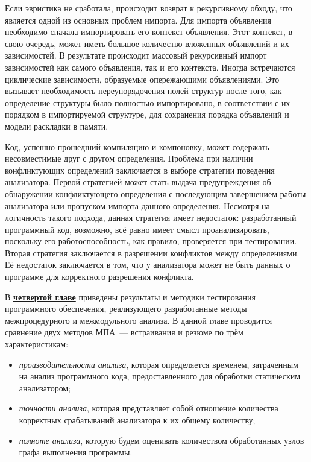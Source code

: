 Если эвристика не сработала, происходит возврат к рекурсивному обходу, что является одной из основных проблем импорта. Для импорта объявления необходимо сначала импортировать его контекст объявления. Этот контекст, в свою очередь, может иметь большое количество вложенных объявлений и их зависимостей. В результате происходит массовый рекурсивный импорт зависимостей как самого объявления, так и его контекста. Иногда встречаются циклические зависимости, образуемые опережающими объявлениями. Это вызывает необходимость переупорядочения  полей структур после того, как определение структуры было полностью импортировано, в соответствии с их порядком в импортируемой структуре, для сохранения порядка объявлений и модели раскладки в памяти.

Код, успешно прошедший компиляцию и компоновку, может содержать несовместимые друг с другом определения. Проблема при наличии конфликтующих определений заключается в выборе стратегии поведения анализатора. Первой стратегией может стать выдача предупреждения об обнаружении конфликтующего определения с последующим завершением работы анализатора или пропуском импорта данного определения. Несмотря на логичность такого подхода, данная стратегия имеет недостаток: разработанный программный код, возможно, всё равно имеет смысл проанализировать, поскольку его работоспособность, как правило, проверяется при тестировании. Вторая стратегия заключается в разрешении конфликтов между определениями. Её недостаток заключается в том, что у анализатора может не быть данных о программе для корректного разрешения конфликта.


В \underline{\textbf{четвертой главе}} приведены результаты и методики тестирования программного обеспечения, реализующего разработанные методы межпроцедурного и межмодульного анализа. В данной главе проводится сравнение двух методов МПА~--- встраивания и резюме по трём характеристикам:
\begin{itemize}
 \item \textit{производительности анализа}, которая определяется временем, затраченным на анализ программного кода, предоставленного для обработки статическим анализатором;
 \item \textit{точности анализа}, которая представляет собой отношение количества корректных срабатываний анализатора к их общему количеству;
 \item \textit{полноте анализа}, которую будем оценивать количеством обработанных узлов графа выполнения программы.
\end{itemize}

